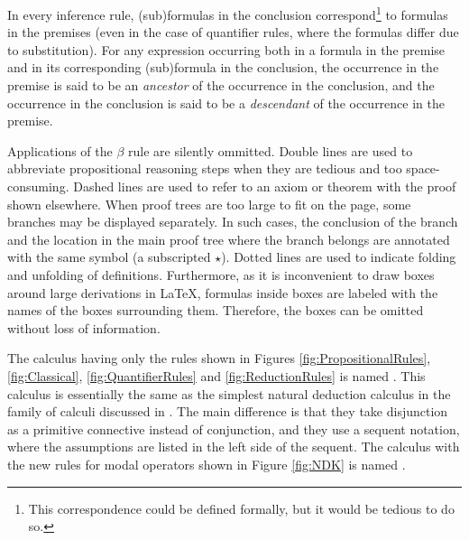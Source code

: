 \documentclass[smallextended]{svjour3}
\begin{document}
In every inference rule, (sub)formulas in the conclusion correspond\footnote{This correspondence could be defined formally, but it would be tedious to do so.} to formulas in the premises (even in the case of quantifier rules, where the formulas differ due to substitution). For any expression occurring both in a formula in the premise and in its corresponding (sub)formula in the conclusion, the occurrence in the premise is said to be an \emph{ancestor} of the occurrence in the conclusion, and the occurrence in the conclusion is said to be a \emph{descendant} of the occurrence in the premise.


\newcommand{\subproof}{\star}

Applications of the $\beta$ rule are silently ommitted. Double lines are used to abbreviate propositional reasoning steps when they are tedious and too space-consuming. Dashed lines are used to refer to an axiom or theorem with the proof shown elsewhere. When proof trees are too large to fit on the page, some branches may be displayed separately. In such cases, the conclusion of the branch and the location in the main proof tree where the branch belongs are annotated with the same symbol (a subscripted $\subproof$). Dotted lines are used to indicate folding and unfolding of definitions. Furthermore, as it is inconvenient to draw boxes around large derivations in \LaTeX, formulas inside boxes are labeled with the names of the boxes surrounding them. Therefore, the boxes can be omitted without loss of information. 

The calculus having only the rules shown in Figures \ref{fig:PropositionalRules}, \ref{fig:Classical}, \ref{fig:QuantifierRules} and \ref{fig:ReductionRules} is named \ND. This calculus is essentially the same as the simplest natural deduction calculus in the family of calculi discussed in \citep{BenzmuellerBrownKohlhase}. The main difference is that they take disjunction as a primitive connective instead of conjunction, and they use a sequent notation, where the assumptions are listed in the left side of the sequent. The calculus with the new rules for modal operators shown in Figure \ref{fig:NDK} is named \NDK.

\newcommand{\s}{\qquad}
\end{document}
